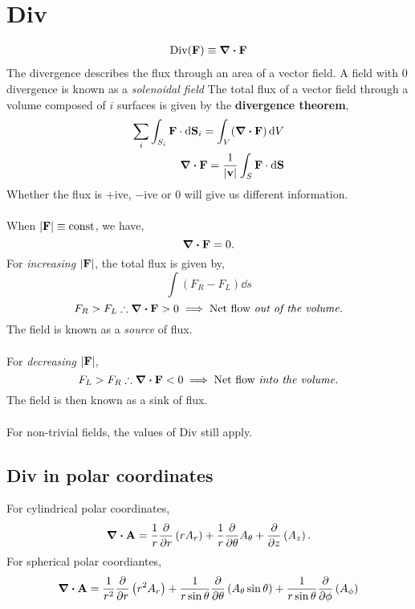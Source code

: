 \documentclass{book}
\begin{document}
\section{Div}
\begin{align}
    \text{Div}(\vb{F}) \equiv \div{\vb{F}}
\end{align}
The divergence describes the flux through an area of a  vector field. A field with 0 divergence is known as a \textit{solenoidal field} The total flux of a vector field through a volume composed of $i$ surfaces is given by the \textbf{divergence theorem},
\begin{equation}
\begin{split}
    \sum_i \int_{S_i}\vb{F}\cdot\dd{\vb{S}}_i = \int_V(\div{\vb{F}})\dd{V} \\
    \div{\vb{F}} = \frac{1}{|\vb{v}|}\int_S \vb{F}\cdot\dd{\vb{S}}
\end{split}
\end{equation}
Whether the flux is $+$ive, $-$ive or 0 will give us different information.\\\\
When $|\vb{F}| \equiv \text{const}$, we have,
\begin{equation}
    \div{\vb{F}} = 0.
\end{equation}
For \textit{increasing} $|\vb{F}|$, the total flux is given by,
\begin{equation}
    \int (F_R - F_L)\dd{s} 
\end{equation}
\begin{equation}
    F_R > F_L \therefore \div{\vb{F}} > 0 \implies \text{Net flow \textit{out of the volume.}}
\end{equation}
The field is known as a \textit{source} of flux.\\\\
For \textit{decreasing} $|\vb{F}|$,
\begin{equation}
    F_L > F_R \therefore \div{\vb{F}} < 0 \implies \text{Net flow \textit{into the volume.}}
\end{equation}
The field is then known as a sink of flux.
\\\\
For non-trivial fields, the values of Div still apply. 
\subsection{Div in polar coordinates}
For cylindrical polar coordinates,
\begin{equation}
    \div{\vb{A}} = \frac{1}{r}\pdv{}{r} \left(rA_r\right)+ \frac{1}{r}\pdv{}{\theta}A_{\theta} + \pdv{}{z}\left(A_z\right).
\end{equation}
For spherical polar coordiantes,
\begin{equation}
    \div{\vb{A}} = \frac{1}{r^2}\pdv{}{r}\left(r^2A_r\right) + \frac{1}{r\sin\theta}\pdv{}{\theta} \left(A_{\theta}\sin\theta\right) + \frac{1}{r\sin\theta}\pdv{}{\phi} \left(A_{\phi}\right)
\end{equation}
\end{document}
